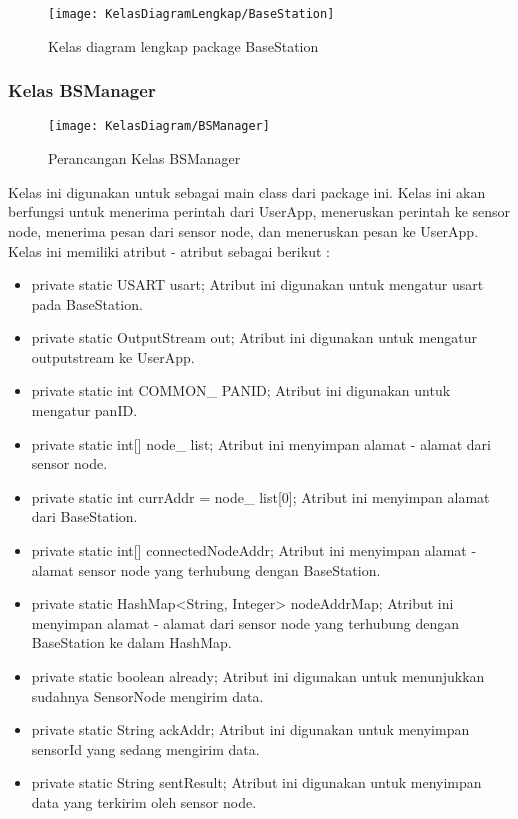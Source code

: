\begin{figure}[H]
	\centering
	\texttt{[image: KelasDiagramLengkap/BaseStation]}  
	\caption[Kelas diagram lengkap package BaseStation]{Kelas diagram lengkap package BaseStation} 
	\label{fig:KelasDiagramLengkapBaseStation} 
\end{figure} 

\subsubsection{Kelas BSManager}
\begin{figure}[H]
	\centering
	\texttt{[image: KelasDiagram/BSManager]}  
	\caption[Perancangan Kelas BSManager]{Perancangan Kelas BSManager} 
	\label{fig:KelasBSManager} 
\end{figure}
Kelas ini digunakan untuk sebagai main class dari package ini. Kelas ini akan berfungsi untuk menerima perintah dari UserApp, meneruskan perintah ke sensor node, menerima pesan dari sensor node, dan meneruskan pesan ke UserApp. Kelas ini memiliki atribut - atribut sebagai berikut :
\begin{itemize}
	\item private static USART usart;
		Atribut ini digunakan untuk mengatur usart pada BaseStation.
	\item private static OutputStream out;
		Atribut ini digunakan untuk mengatur outputstream ke UserApp.
	\item private static int COMMON\_ PANID;
		Atribut ini digunakan untuk mengatur panID.
	\item private static int[] node\_ list;
		Atribut ini menyimpan alamat - alamat dari sensor node.
	\item private static int currAddr = node\_ list[0];
		Atribut ini menyimpan alamat dari BaseStation.
	\item private static int[] connectedNodeAddr;
		Atribut ini menyimpan alamat - alamat sensor node yang terhubung dengan BaseStation.
	\item private static HashMap<String, Integer> nodeAddrMap;
		Atribut ini menyimpan alamat - alamat dari sensor node yang terhubung dengan BaseStation ke dalam HashMap.
	\item private static boolean already;
		Atribut ini digunakan untuk menunjukkan sudahnya SensorNode mengirim data.
	\item	private static String ackAddr;
		Atribut ini digunakan untuk menyimpan sensorId yang sedang mengirim data.
	\item private static String sentResult;
		Atribut ini digunakan untuk menyimpan data yang terkirim oleh sensor node.
		
\end{itemize}
